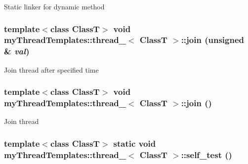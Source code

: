 Static linker for dynamic method 

\hypertarget{classmyThreadTemplates_1_1thread__1_a7acc2e784a8efe4b74a4bdded5feebb3}{
\subsubsection[{join}]{\setlength{\rightskip}{0pt plus 5cm}template$<$class ClassT$>$ void {\bf myThreadTemplates::thread\_}$<$ ClassT $>$::join (unsigned \& {\em val})}}
\label{classmyThreadTemplates_1_1thread__1_a7acc2e784a8efe4b74a4bdded5feebb3}


Join thread after specified time 

\hypertarget{classmyThreadTemplates_1_1thread__1_ae393ee33ecbfee158a03a4c0f21cf95c}{
\subsubsection[{join}]{\setlength{\rightskip}{0pt plus 5cm}template$<$class ClassT$>$ void {\bf myThreadTemplates::thread\_}$<$ ClassT $>$::join ()}}
\label{classmyThreadTemplates_1_1thread__1_ae393ee33ecbfee158a03a4c0f21cf95c}


Join thread 

\hypertarget{classmyThreadTemplates_1_1thread__1_add97f72749590d4023fd23fcd0a3dece}{
\subsubsection[{self\_\-test}]{\setlength{\rightskip}{0pt plus 5cm}template$<$class ClassT$>$ static void {\bf myThreadTemplates::thread\_}$<$ ClassT $>$::self\_\-test ()}}
\label{classmyThreadTemplates_1_1thread__1_add97f72749590d4023fd23fcd0a3dece}


